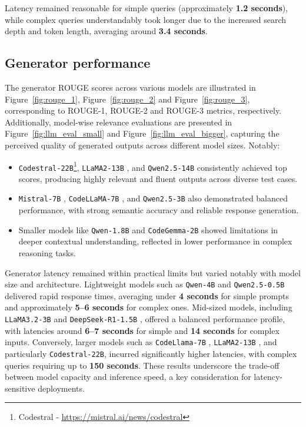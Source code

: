 Latency remained reasonable for simple queries (approximately \textbf{1.2 seconds}), while complex queries understandably took longer due to the increased search depth and token length, averaging around \textbf{3.4 seconds}.


\subsection*{Generator performance}

The generator ROUGE scores across various models are illustrated in Figure~\ref{fig:rouge_1}, Figure~\ref{fig:rouge_2} and Figure~\ref{fig:rouge_3}, corresponding to ROUGE-1, ROUGE-2 and ROUGE-3 metrics, respectively. Additionally, model-wise relevance evaluations are presented in Figure~\ref{fig:llm_eval_small} and Figure~\ref{fig:llm_eval_bigger}, capturing the perceived quality of generated outputs across different model sizes. Notably:

\begin{itemize}
	\item \texttt{Codestral-22B}\footnote{\label{codestral}Codestral - \url{https://mistral.ai/news/codestral}}, \texttt{LLaMA2-13B} \cite{llama2}, and \texttt{Qwen2.5-14B} \cite{hui2024qwen2.5} consistently achieved top scores, producing highly relevant and fluent outputs across diverse test cases.
	\item \texttt{Mistral-7B} \cite{mistral}, \texttt{CodeLLaMA-7B} \cite{roziere2023code}, and \texttt{Qwen2.5-3B} \cite{hui2024qwen2.5} also demonstrated balanced performance, with strong semantic accuracy and reliable response generation.
	\item Smaller models like \texttt{Qwen-1.8B} \cite{bai2023qwen} and \texttt{CodeGemma-2B} \cite{codegemma} showed limitations in deeper contextual understanding, reflected in lower performance in complex reasoning tasks.
\end{itemize}

Generator latency remained within practical limits but varied notably with model size and architecture. Lightweight models such as \texttt{Qwen-4B} \cite{baichuan2} and \texttt{Qwen2.5-0.5B} \cite{hui2024qwen2.5} delivered rapid response times, averaging under \textbf{4 seconds} for simple prompts and approximately \textbf{5–6 seconds} for complex ones. Mid-sized models, including \texttt{LLaMA3.2-3B} \cite{llama3} and \texttt{DeepSeek-R1-1.5B} \cite{deepseek_r1}, offered a balanced performance profile, with latencies around \textbf{6–7 seconds} for simple and \textbf{14 seconds} for complex inputs. Conversely, larger models such as \texttt{CodeLlama-7B} \cite{codellama}, \texttt{LLaMA2-13B} \cite{llama2}, and particularly \texttt{Codestral-22B}, incurred significantly higher latencies, with complex queries requiring up to \textbf{150 seconds}. These results underscore the trade-off between model capacity and inference speed, a key consideration for latency-sensitive deployments.

